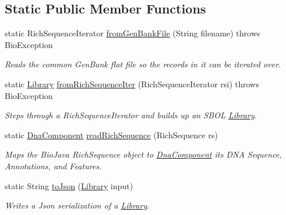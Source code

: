 \subsection*{Static Public Member Functions}
\begin{DoxyCompactItemize}
\item 
static RichSequenceIterator \hyperlink{classorg_1_1sbolstandard_1_1lib_s_b_o_lj_1_1_s_b_o_lutil_ab30e7fc9ccb218e864e45cad4366304a}{fromGenBankFile} (String filename)  throws BioException 
\begin{DoxyCompactList}\small\item\em Reads the common GenBank flat file so the records in it can be iterated over. \item\end{DoxyCompactList}\item 
static \hyperlink{classorg_1_1sbolstandard_1_1lib_s_b_o_lj_1_1_library}{Library} \hyperlink{classorg_1_1sbolstandard_1_1lib_s_b_o_lj_1_1_s_b_o_lutil_a375e674a9edc77307e250df41d76f02d}{fromRichSequenceIter} (RichSequenceIterator rsi)  throws BioException 
\begin{DoxyCompactList}\small\item\em Steps through a RichSequenceIterator and builds up an SBOL \hyperlink{classorg_1_1sbolstandard_1_1lib_s_b_o_lj_1_1_library}{Library}. \item\end{DoxyCompactList}\item 
static \hyperlink{classorg_1_1sbolstandard_1_1lib_s_b_o_lj_1_1_dna_component}{DnaComponent} \hyperlink{classorg_1_1sbolstandard_1_1lib_s_b_o_lj_1_1_s_b_o_lutil_a36d32367508f84b9628401ab634219b2}{readRichSequence} (RichSequence rs)
\begin{DoxyCompactList}\small\item\em Maps the BioJava RichSequence object to \hyperlink{classorg_1_1sbolstandard_1_1lib_s_b_o_lj_1_1_dna_component}{DnaComponent} its DNA Sequence, Annotations, and Features. \item\end{DoxyCompactList}\item 
static String \hyperlink{classorg_1_1sbolstandard_1_1lib_s_b_o_lj_1_1_s_b_o_lutil_a4fd6d767f8ac9cc03cc70a9aff85161b}{toJson} (\hyperlink{classorg_1_1sbolstandard_1_1lib_s_b_o_lj_1_1_library}{Library} input)
\begin{DoxyCompactList}\small\item\em Writes a Json serialization of a \hyperlink{classorg_1_1sbolstandard_1_1lib_s_b_o_lj_1_1_library}{Library}. \item\end{DoxyCompactList}\item 

\end{DoxyCompactItemize}
